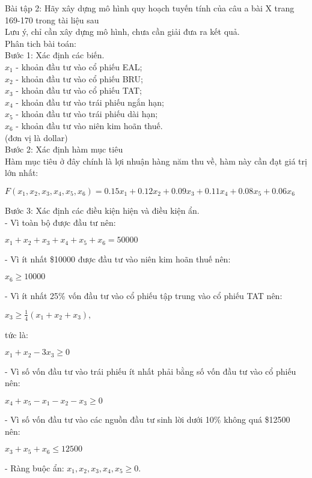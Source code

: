 
Bài tập 2: Hãy xây dựng mô hình quy hoạch tuyến tính của câu a bài X trang 169-170 trong tài liệu sau 
\\
Lưu ý, chỉ cần xây dựng mô hình, chưa cần giải đưa ra kết quả.
\\
Phân tich bài toán:
\\
Bước 1: Xác định các biến.
\\
$x_1$ - khoản đầu tư vào cổ phiếu EAL;
\\
$x_2$ - khoản đầu tư vào cổ phiếu BRU;
\\
$x_3$ - khoản đầu tư vào cổ phiếu TAT;
\\
$x_4$ - khoản đầu tư vào trái phiếu ngắn hạn;
\\
$x_5$ - khoản đầu tư vào trái phiếu dài hạn;
\\
$x_6$ - khoản đầu tư vào niên kim hoãn thuế.
\\
(đơn vị là dollar)
\\
Bước 2: Xác định hàm mục tiêu
\\
Hàm mục tiêu ở đây chính là lợi nhuận hàng năm thu về, hàm này cần đạt giá trị lớn nhất:
\begin{center}
    $F(x_1, x_2, x_3, x_4, x_5, x_6) = 0.15 x_1 + 0.12 x_2 + 0.09 x_3 + 0.11 x_4 + 0.08 x_5 + 0.06 x_6$
\end{center}
Bước 3: Xác định các điều kiện hiện và điều kiện ẩn.
\\
- Vì toàn bộ  được đầu tư nên:
\begin{center}
    $x_1 + x_2 + x_3 + x_4 + x_5 + x_6 = 50000$
\end{center}
- Vì ít nhất \$10000 được đầu tư vào niên kim hoãn thuế nên:
\begin{center}
    $x_6 \geq 10000$
\end{center}
- Vì ít nhất 25\% vốn đầu tư vào cổ phiếu tập trung vào cổ phiếu TAT nên:
\begin{center}
    $x_3 \geq \frac{1}{4} (x_1 + x_2 + x_3),$
\end{center}
tức là:
\begin{center}
    $x_1 + x_2 - 3 x_3 \geq 0$
\end{center}
- Vì số vốn đầu tư vào trái phiếu ít nhất phải bằng số vốn đầu tư vào cổ phiếu nên:
\begin{center}
    $x_4 + x_5 - x_1 - x_2 - x_3 \geq 0$
\end{center}
- Vì số vốn đầu tư vào các nguồn đầu tư sinh lời dưới 10\% không quá \$12500 nên:
\begin{center}
    $x_3 + x_5 + x_6 \leq 12500$
\end{center}
- Ràng buộc ẩn: $x_1, x_2, x_3, x_4, x_5 \geq 0.$
\\

